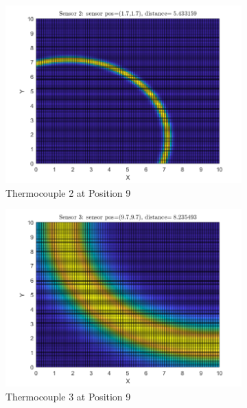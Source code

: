 \documentclass[12pt]{article}
\begin{document}
\begin{figure}[H]
\begin{subfigure}[h]{0.4\textwidth}
        \includegraphics[width=\textwidth]{images/P9S2.png}
        \caption{Thermocouple 2 at Position 9}
        \label{fig:P9S2}
    \end{subfigure}
    \baselineskip
    \begin{subfigure}[h]{0.4\textwidth}
        \includegraphics[width=\textwidth]{images/P9S3.png}
        \caption{Thermocouple 3 at Position 9}
        \label{fig:P9S3}
    \end{subfigure}
    \begin{subfigure}[h]{0.4\textwidth}

\end{subfigure}
\end{figure}
\end{document}

